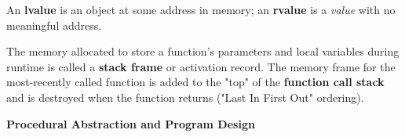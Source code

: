 \documentclass[7pt, twocolumn]{extarticle}
\begin{document}
\begin{small}





An \textbf{lvalue} is an object at some address in memory; an \textbf{rvalue} is a \textit{value} with no meaningful address.

The memory allocated to store a function's parameters and local variables during runtime is called a \textbf{stack frame} or activation record. The memory frame for the most-recently called function is added to the "top" of the \textbf{function call stack} and is destroyed when the function returns ("Last In First Out" ordering).
\smallskip







\textcolor{headcolor}{\textbf{Procedural Abstraction and Program Design}}


\end{small}
\end{document}
